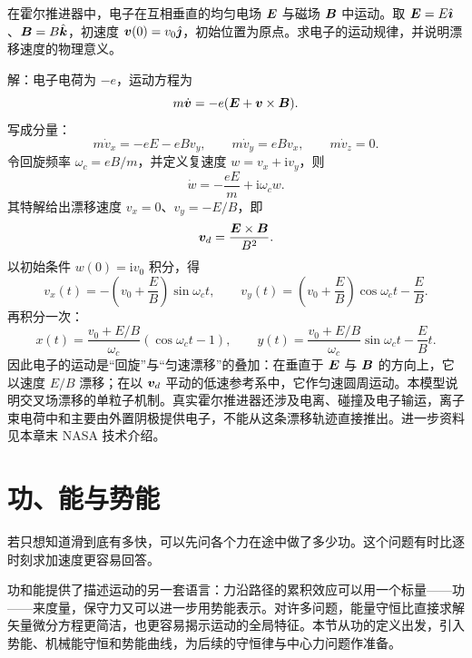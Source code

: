 \begin{example}[霍尔推进器中的电子]
在霍尔推进器中，电子在互相垂直的均匀电场 $\boldsymbol{E}$ 与磁场 $\boldsymbol{B}$ 中运动。取 $\boldsymbol{E}=E\hat{\boldsymbol{\imath}}$、$\boldsymbol{B}=B\hat{\boldsymbol{k}}$，初速度 $\boldsymbol{v}(0)=v_0\hat{\boldsymbol{\jmath}}$，初始位置为原点。求电子的运动规律，并说明漂移速度的物理意义。

\begin{center}
\end{center}

解：电子电荷为 $-e$，运动方程为
\[
m\dot{\boldsymbol{v}}=-e(\boldsymbol{E}+\boldsymbol{v}\times\boldsymbol{B}).
\]
写成分量：
\[
m\dot v_x=-eE-eBv_y,\qquad
m\dot v_y=eBv_x,\qquad
m\dot v_z=0.
\]
令回旋频率 $\omega_c=eB/m$，并定义复速度 $w=v_x+\mathrm{i}v_y$，则
\[
\dot w=-\frac{eE}{m}+\mathrm{i}\omega_c w .
\]
其特解给出漂移速度 $v_x=0$、$v_y=-E/B$，即
\[
\boldsymbol{v}_d=\frac{\boldsymbol{E}\times\boldsymbol{B}}{B^2}.
\]
以初始条件 $w(0)=\mathrm{i}v_0$ 积分，得
\[
v_x(t)=-\left(v_0+\frac{E}{B}\right)\sin\omega_ct,\qquad
v_y(t)=\left(v_0+\frac{E}{B}\right)\cos\omega_ct-\frac{E}{B}.
\]
再积分一次：
\[
x(t)=\frac{v_0+E/B}{\omega_c}(\cos\omega_ct-1),\qquad
y(t)=\frac{v_0+E/B}{\omega_c}\sin\omega_ct-\frac{E}{B}t .
\]
因此电子的运动是“回旋”与“匀速漂移”的叠加：在垂直于 $\boldsymbol{E}$ 与 $\boldsymbol{B}$ 的方向上，它以速度 $E/B$ 漂移；在以 $\boldsymbol{v}_d$ 平动的低速参考系中，它作匀速圆周运动。本模型说明交叉场漂移的单粒子机制。真实霍尔推进器还涉及电离、碰撞及电子输运，离子束电荷中和主要由外置阴极提供电子，不能从这条漂移轨迹直接推出。进一步资料见本章末 NASA 技术介绍。
\end{example}

\section{功、能与势能}

若只想知道滑到底有多快，可以先问各个力在途中做了多少功。这个问题有时比逐时刻求加速度更容易回答。

功和能提供了描述运动的另一套语言：力沿路径的累积效应可以用一个标量——功——来度量，保守力又可以进一步用势能表示。对许多问题，能量守恒比直接求解矢量微分方程更简洁，也更容易揭示运动的全局特征。本节从功的定义出发，引入势能、机械能守恒和势能曲线，为后续的守恒律与中心力问题作准备。

